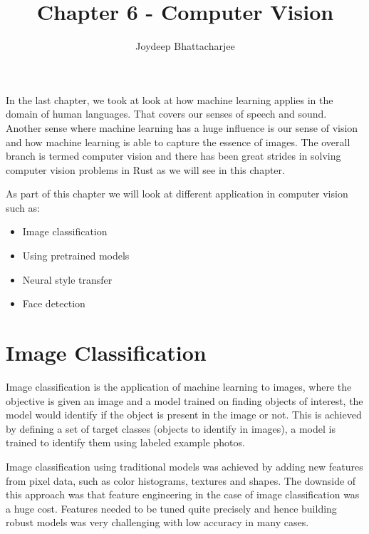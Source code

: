 \documentclass{book}
\begin{document}
\title{Chapter 6 - Computer Vision}
\author {Joydeep Bhattacharjee}

\maketitle


In the last chapter, we took at look at how machine learning applies in the domain of human languages. That covers our senses of speech and sound. Another sense where machine learning has a huge influence is our sense of vision and how machine learning is able to capture the essence of images. The overall branch is termed computer vision and there has been great strides in solving computer vision problems in Rust as we will see in this chapter.

As part of this chapter we will look at different application in computer vision such as:

\begin{itemize}
	\item Image classification
	\item Using pretrained models
	\item Neural style transfer
	\item Face detection
\end{itemize}

\section{Image Classification}%
Image classification is the application of machine learning to images, where the objective is given an image and a model trained on finding objects of interest, the model would identify if the object is present in the image or not. This is achieved by defining a set of target classes (objects to identify in images), a model is trained to  identify them using labeled example photos.

Image classification using traditional models was achieved by adding new features from pixel data, such as color histograms, textures and shapes. The downside of this approach was that feature engineering in the case of image classification was a huge cost. Features needed to be tuned quite precisely and hence building robust models was very challenging with low accuracy in many cases.
\end{document}
